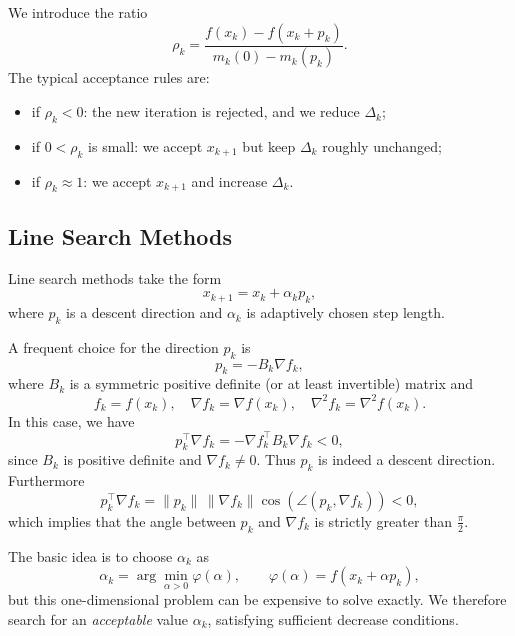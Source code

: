 We introduce the ratio
\begin{equation}
    \rho_k =
    \frac{f(x_k) - f(x_k + p_k)}{m_k(0) - m_k(p_k)}.
\end{equation}
The typical acceptance rules are:
\begin{itemize}
    \item if $\rho_k < 0$: the new iteration is rejected, and we reduce $\Delta_k$;
    \item if $0 < \rho_k$ is small: we accept $x_{k+1}$ but keep $\Delta_k$
    roughly unchanged;
    \item if $\rho_k \approx 1$: we accept $x_{k+1}$ and increase $\Delta_k$.
\end{itemize}

\subsection{Line Search Methods}
\label{subsec:2.3.2}

Line search methods take the form
\[
    x_{k+1} = x_k + \alpha_k p_k,
\]
where $p_k$ is a descent direction and $\alpha_k$ is adaptively chosen step length.

A frequent choice for the direction $p_k$ is
\begin{equation}
    p_k = -B_k \nabla f_k,
\end{equation}
where $B_k$ is a symmetric positive definite (or at least invertible) matrix and
\[
    f_k = f(x_k),\quad \nabla f_k = \nabla f(x_k),\quad
    \nabla^2 f_k = \nabla^2 f(x_k).
\]
In this case, we have
\begin{equation}
    p_k^\top \nabla f_k
    = -\nabla f_k^\top B_k \nabla f_k < 0,
\end{equation}
since $B_k$ is positive definite and $\nabla f_k \neq 0$. Thus $p_k$ is
indeed a descent direction. Furthermore
\[
    p_k^\top \nabla f_k
    = \|p_k\|\,\|\nabla f_k\|\cos(\angle(p_k,\nabla f_k)) < 0,
\]
which implies that the angle between $p_k$ and $\nabla f_k$ is strictly greater
than $\frac{\pi}{2}$.

\medskip

The basic idea is to choose $\alpha_k$ as
\[
    \alpha_k = \arg\min_{\alpha>0} \varphi(\alpha),
    \qquad \varphi(\alpha) = f(x_k + \alpha p_k),
\]
but this one-dimensional problem can be expensive to solve exactly. We
therefore search for an \emph{acceptable} value $\alpha_k$, satisfying sufficient
decrease conditions.

